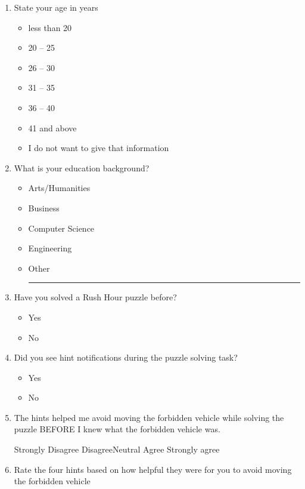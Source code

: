 \documentclass[doctor]{thesis} %
\theoremstyle{plain}
\begin{document}
\begin{enumerate}[topsep=-4em]
\item State your age in years
\begin{itemize}[topsep=-6em, label={o}]
\itemsep-1em 
\item less than 20
\item 20 -- 25
\item 26 -- 30
\item 31 -- 35
\item 36 -- 40
\item 41 and above
\item I do not want to give that information
\end{itemize}
\item What is your education background?
\begin{itemize}[topsep=-6em, label={o}]
\itemsep-1em 
\item Arts/Humanities
\item Business
\item Computer Science
\item Engineering
\item Other \rule{4cm}{0.4pt}
\end{itemize}
\item Have you solved a Rush Hour puzzle before?
\begin{itemize}[topsep=-6em, label={o}]
\itemsep-1em 
\item Yes
\item No
\end{itemize}
\item Did you see hint notifications during the puzzle solving task?
\begin{itemize}[topsep=-6em, label={o}]
\itemsep-1em 
\item Yes
\item No
\end{itemize}
\item The hints helped me avoid moving the forbidden vehicle while solving the puzzle BEFORE I knew what the forbidden vehicle was.
\par Strongly Disagree \hspace{1cm} Disagree\hspace{1cm}Neutral\hspace{1cm} Agree\hspace{1cm} Strongly agree
\item Rate the four hints based on how helpful they were for you to avoid moving the forbidden vehicle
\begin{itemize}[topsep=-6em, label={o}]

\end{itemize}
\end{enumerate}
\end{document}
